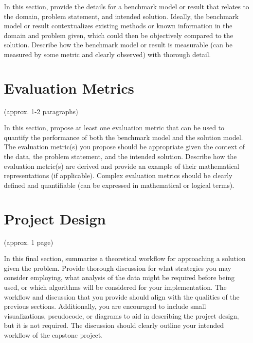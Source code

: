 \documentclass{article}
\begin{document}
In this section, provide the details for a benchmark model or result that relates to the domain, problem statement, and intended solution. Ideally, the benchmark model or result contextualizes existing methods or known information in the domain and problem given, which could then be objectively compared to the solution. Describe how the benchmark model or result is measurable (can be measured by some metric and clearly observed) with thorough detail.


\section{Evaluation Metrics}
\label{sec:metrics}
(approx. 1-2 paragraphs)

In this section, propose at least one evaluation metric that can be used to quantify the performance of both the benchmark model and the solution model. The evaluation metric(s) you propose should be appropriate given the context of the data, the problem statement, and the intended solution. Describe how the evaluation metric(s) are derived and provide an example of their mathematical representations (if applicable). Complex evaluation metrics should be clearly defined and quantifiable (can be expressed in mathematical or logical terms).


\section{Project Design}
\label{sec:design}
(approx. 1 page)

In this final section, summarize a theoretical workflow for approaching a solution given the problem. Provide thorough discussion for what strategies you may consider employing, what analysis of the data might be required before being used, or which algorithms will be considered for your implementation. The workflow and discussion that you provide should align with the qualities of the previous sections. Additionally, you are encouraged to include small visualizations, pseudocode, or diagrams to aid in describing the project design, but it is not required. The discussion should clearly outline your intended workflow of the capstone project.


  


\end{document}
